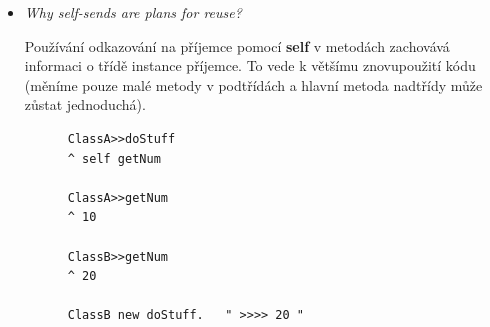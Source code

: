 \documentclass{szzclass}
\begin{document}
\begin{itemize}
      \item \textit{Why self-sends are plans for reuse?}
      
      Používání odkazování na příjemce pomocí \textbf{self} v metodách zachovává informaci o třídě instance
      příjemce. To vede k většímu znovupoužití kódu (měníme pouze malé metody v podtřídách a hlavní metoda
      nadtřídy může zůstat jednoduchá).

      \begin{verbatim}
      ClassA>>doStuff
      ^ self getNum

      ClassA>>getNum
      ^ 10

      ClassB>>getNum
      ^ 20

      ClassB new doStuff.   " >>>> 20 "
      \end{verbatim}

\end{itemize}
\end{document}
